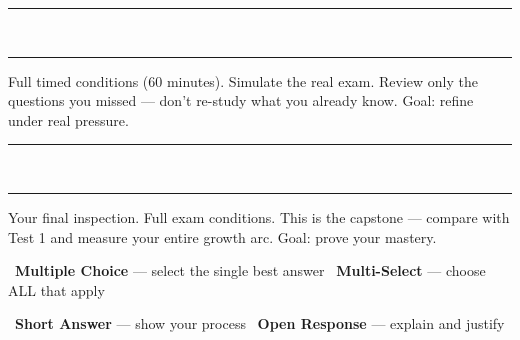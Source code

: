 {\vspace{1mm}
\begin{center}
    \textcolor{funTeal!30}{\rule{0.3\linewidth}{0.4pt}}
    \textcolor{funTeal!50}{~\faAngleDoubleDown~}
    \textcolor{funTeal!30}{\rule{0.3\linewidth}{0.4pt}}
\end{center}
\vspace{1mm}

\noindent
\begin{tcolorbox}[
    enhanced,
    colback=funPurple!5,
    colframe=funPurple!40,
    arc=4pt, boxrule=1.5pt,
    left=5mm, right=5mm, top=3mm, bottom=3mm,
    title={\textcolor{white}{Phase III: Finishing (Tests 7--9)}},
    colbacktitle=funPurple!60,
    fonttitle=\bfseries\sffamily,
    borderline west={3pt}{0pt}{funPurple!60},
]
    \small
    Full timed conditions (60 minutes). Simulate the real exam.
    Review only the questions you missed --- don't re-study
    what you already know. Goal: refine under real pressure.
\end{tcolorbox}

\vspace{1mm}
\begin{center}
    \textcolor{funPurple!30}{\rule{0.3\linewidth}{0.4pt}}
    \textcolor{funPurple!50}{~\faAngleDoubleDown~}
    \textcolor{funPurple!30}{\rule{0.3\linewidth}{0.4pt}}
\end{center}
\vspace{1mm}

\noindent
\begin{tcolorbox}[
    enhanced,
    colback=funGreen!6,
    colframe=funGreen!45,
    arc=4pt, boxrule=1.5pt,
    left=5mm, right=5mm, top=3mm, bottom=3mm,
    title={\textcolor{white}{Phase IV: Capstone (Test 10)}},
    colbacktitle=funGreen!65,
    fonttitle=\bfseries\sffamily,
    borderline west={3pt}{0pt}{funGreen!60},
]
    \small
    Your final inspection. Full exam conditions.
    This is the capstone --- compare with Test 1 and measure
    your entire growth arc. Goal: prove your mastery.
\end{tcolorbox}

\vspace{3mm}

\begin{tcolorbox}[
    enhanced,
    colback=funGray!4,
    colframe=funBlue!25,
    arc=6pt, boxrule=0.8pt,
    left=5mm, right=5mm, top=3mm, bottom=3mm,
    title={\small\textcolor{white}{\faClipboardList~Blueprint Specifications}},
    colbacktitle=funBlue!55,
    fonttitle=\bfseries\sffamily,
]
    \small
    \textcolor{funBlue}{\faDraftingCompass}~\textbf{Multiple Choice} --- select the single best answer\hfill
    \textcolor{funTeal}{\faDraftingCompass}~\textbf{Multi-Select} --- choose ALL that apply

    \smallskip
    \textcolor{funPurple}{\faDraftingCompass}~\textbf{Short Answer} --- show your process\hfill
    \textcolor{funGreen}{\faDraftingCompass}~\textbf{Open Response} --- explain and justify
\end{tcolorbox}

}

\newpage
